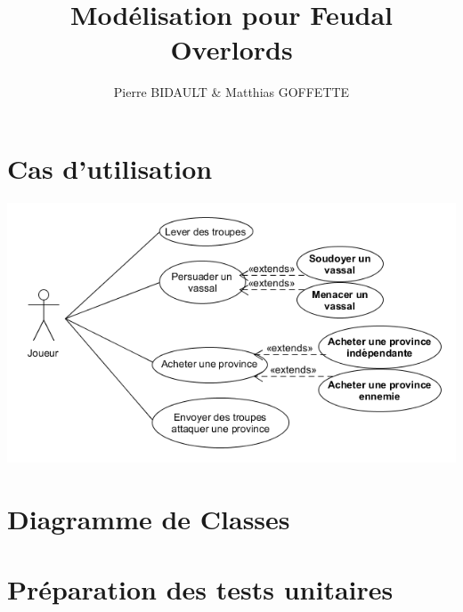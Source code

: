 \documentclass[12pt,a4paper]{article}
\author{Pierre BIDAULT \& Matthias GOFFETTE}
\title{Modélisation pour Feudal Overlords}
\begin{document}
\maketitle

\section{Cas d'utilisation}

\includegraphics[scale=0.7]{Diagramme_Cas_Utilisation/Diagramme_Cas_Utilisation.png}

\section{Diagramme de Classes}

\section{Préparation des tests unitaires}
\end{document}
